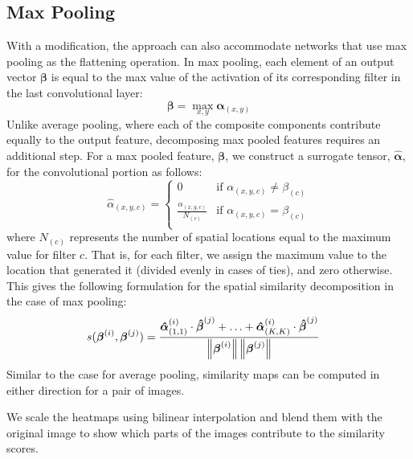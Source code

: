 \subsection{Max Pooling}
With a modification, the approach can also accommodate networks that use max pooling as the flattening operation. In max pooling, each element of an output vector $\boldsymbol{\beta}$ is equal to the max value of the activation of its corresponding filter in the last convolutional layer:
\begin{equation}
\boldsymbol{\beta} = \max_{x,y} \boldsymbol{\alpha}_{(x,y)}
\label{eq:maxPool}
\end{equation}
\noindent Unlike average pooling, where each of the composite components contribute equally to the output feature, decomposing max pooled features requires an additional step. For a max pooled feature, $\boldsymbol{\beta}$, we construct a surrogate tensor, $\boldsymbol{\hat{\alpha}}$, for the convolutional portion as follows:
\begin{equation}
    \hat{\alpha}_{(x,y,c)} = \begin{cases}
    0 & \text{if } \alpha_{(x,y,c)} \neq \beta_{(c)} \\
    \frac{\alpha_{(x,y,c)}}{N_{(c)}} & \text{if } \alpha_{(x,y,c)} = \beta_{(c)} \\
    \end{cases}
\end{equation}
\noindent where $N_{(c)}$ represents the number of spatial locations equal to the maximum value for filter $c$. That is, for each filter, we assign the maximum value to the location that generated it (divided evenly in cases of ties), and zero otherwise. This gives the following formulation for the spatial similarity decomposition in the case of max pooling:
\begin{align}
     s(\boldsymbol{\beta}^{(i)},\boldsymbol{\beta}^{(j)}) &=
    \frac{\boldsymbol{\hat{\alpha}}^{(i)}_{(1,1)} \cdot \boldsymbol{\hat{\beta}}^{(j)} + \ldots + \boldsymbol{\hat{\alpha}}^{(i)}_{(K,K)} \cdot \boldsymbol{\hat{\beta}}^{(j)}}{\left\lVert\boldsymbol{\beta}^{(i)}\right\rVert\left\lVert\boldsymbol{\beta}^{(j)}\right\rVert}
\end{align}
Similar to the case for average pooling, similarity maps can be computed in either direction for a pair of images. 

We scale the heatmaps using bilinear interpolation and blend them with the original image to show which parts of the images contribute to the similarity scores.

